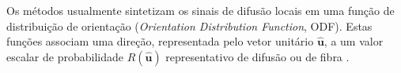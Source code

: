 \documentclass[
    12pt,                %
    oneside,            %
    a4paper,            %
    english,            %
    french,                %
    spanish,            %
    brazil                %
    ]{abntex2}
\begin{document}


%


Os métodos usualmente sintetizam os sinais de difusão locais em uma função de distribuição de orientação (\textit{Orientation Distribution Function}, ODF). Estas funções associam uma direção, representada pelo vetor unitário $\mathbf{\hat{u}}$, a um valor escalar de probabilidade $R(\mathbf{\hat{u}})$ representativo de difusão \cite{TuchQBall2004, wedeen2005} ou de fibra \cite{Tournier2004DirectEO, tournier2007}. %
\end{document}
